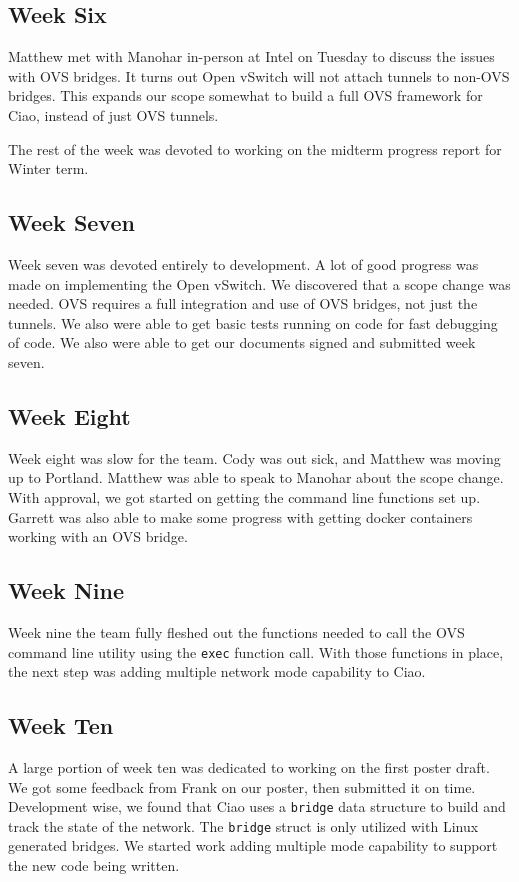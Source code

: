 \documentclass[10pt,onecolumn,journal,draftclsnofoot]{IEEEtran}
\begin{document}
\subsection{Week Six}

Matthew met with Manohar in-person at Intel on Tuesday to discuss the issues
with OVS bridges. It turns out Open vSwitch will not attach tunnels to non-OVS
bridges. This expands our scope somewhat to build a full OVS framework for Ciao,
instead of just OVS tunnels.

The rest of the week was devoted to working on the midterm progress report for
Winter term.

\subsection{Week Seven}
Week seven was devoted entirely to development. A lot of good progress was made
on implementing the Open vSwitch. We discovered that a scope change was needed.
OVS requires a full integration and use of OVS bridges, not just the tunnels. 
We also were able to get basic tests running on code for fast debugging of
code. We also were able to get our documents signed and submitted week seven.

\subsection{Week Eight}
Week eight was slow for the team. Cody was out sick, and Matthew was moving 
up to Portland. Matthew was able to speak to Manohar about the scope change. 
With approval, we got started on getting the command line functions set up.
Garrett was also able to make some progress with getting docker containers
working with an OVS bridge.

\subsection{Week Nine}
Week nine the team fully fleshed out the functions needed to call the OVS
command line utility using the \texttt{exec} function call. With those functions
in place, the next step was adding multiple network mode capability to Ciao.

\subsection{Week Ten}
A large portion of week ten was dedicated to working on the first poster draft.
We got some feedback from Frank on our poster, then submitted it on time. Development
wise, we found that Ciao uses a \texttt{bridge} data structure to build and 
track the state of the network. The \texttt{bridge} struct is only utilized with
Linux generated bridges. We started work adding multiple mode capability to
support the new code being written.
\end{document}
